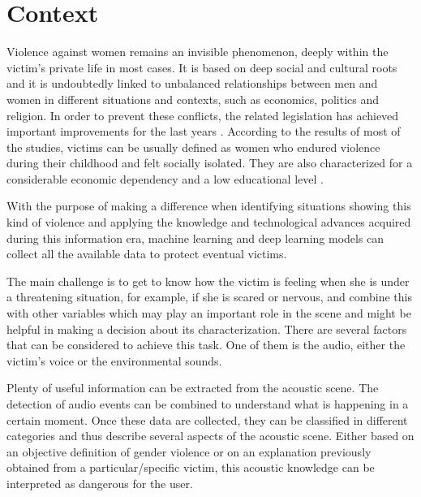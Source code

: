\section{Context}

	Violence against women remains an invisible phenomenon, deeply within the victim’s private life in most cases. It is based on deep social and cultural roots and it is undoubtedly linked to unbalanced relationships between men and women in different situations and contexts, such as economics, politics and religion. In order to prevent these conflicts, the related legislation has achieved important improvements for the last years \cite{}. According to the results of most of the studies, victims can be usually defined as women who endured violence during their childhood and felt socially isolated. They are also characterized for a considerable economic dependency and a low educational level \cite{}.

	With the purpose of making a difference when identifying situations showing this kind of violence and applying the knowledge and technological advances acquired during this information era, machine learning and deep learning models can collect all the available data to protect eventual victims. 
	
	The main challenge is to get to know how the victim is feeling when she is under a threatening situation, for example, if she is scared or nervous, and combine this with other variables which may play an important role in the scene and might be helpful in making a decision about its characterization. There are several factors that can be considered to achieve this task. One of them is the audio, either the victim's voice or the environmental sounds.
	
	Plenty of useful information can be extracted from the acoustic scene. %
	The detection of audio events can be combined to understand %
	what is happening in a certain moment. Once these data are collected, they can be classified in different categories and thus describe several aspects of the acoustic scene. Either based on an objective definition of gender violence or on an explanation previously obtained from a particular/specific victim, this acoustic knowledge can be interpreted as dangerous for the user. 

